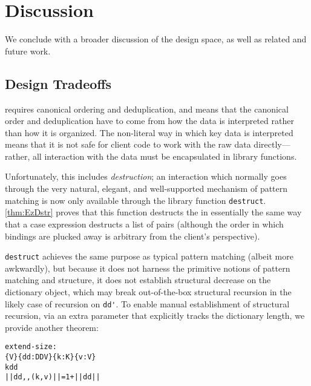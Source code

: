 \section{Discussion}
\label{sec:Discussion}

We conclude with a broader discussion of the design space, as well as related
and future work.

\vspace{0.05in} %

\subsection{Design Tradeoffs}
\label{sec:Tradeoffs}


\SemInj{} requires canonical ordering and deduplication, and \SemTot{} means that the canonical order and deduplication have to come from
how the data is interpreted rather than how it is organized. The non-literal way in which key data is interpreted means that it is not
safe for client code to work with the raw data directly---rather, all interaction with the data must be
encapsulated in library functions.

Unfortunately, this includes \emph{destruction}; an interaction which
normally goes through the very natural, elegant, and well-supported mechanism of pattern matching is now
only available through the library function \verb+destruct+. \autoref{thm:EzDstr} proves that this function
destructs the \dd{} in essentially the same way that a case expression destructs a list of pairs (although
the order in which bindings are plucked away is arbitrary from the client's perspective).

\verb+destruct+ achieves the same purpose as typical pattern matching (albeit more awkwardly), but because it
does not harness the primitive notions of pattern matching and structure, it does not establish structural
decrease on the dictionary object, which may break out-of-the-box structural recursion in the likely case
of recursion on \verb+dd'+. To enable manual establishment of structural recursion, via an extra parameter that
explicitly tracks the dictionary length, we provide another theorem:

\begin{alltt}
  extend-size :
    \altFAll\{V\} \{dd : DD V\} \{k : K\} \{v : V\} \altRArr
      k \altNIn dd \altRArr
      || dd ,, (k , v) || = 1 + || dd ||
\end{alltt}

